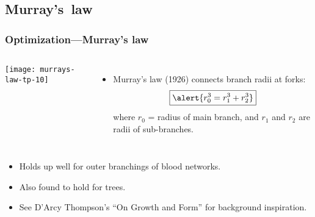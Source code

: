 \begin{frame}

  \showtarotcards{0.35}{
    john-dory,
    overview,
    complex-networks,
    random-networks,
    scale-free-networks,
    small-world-networks,
    theory-six-degrees,
    landscapes-of-forking-paths,
    networks-of-blood,
    trees-of-reality,
    orders-of-streams,
    laws-of-branching,
    unknown-mechanism,
    law-of-optimal-forks,
}

\end{frame}

\subsection{Murray's\ law}

\begin{frame}
  \frametitle{Optimization---Murray's law}

  \begin{columns}
    \texttt{[image: murrays-law-tp-10]}
    \begin{itemize}
    \item<1-> Murray's law (1926) connects branch radii at forks:\cite{murray1926a,murray1926b,murray1927a,labarbera1990a,thompson1961a}
      $$ \boxed{ \alert{r_0^{3} = r_1^{3} + r_2^{3}}} $$
      where $r_0$ = radius of main branch,
      and $r_1$ and $r_2$ are radii of sub-branches.
    \end{itemize}
  \end{columns}
    \begin{itemize}
    \item<2-> Holds up well for outer branchings of blood networks.
    \item<3-> Also found to hold for trees\cite{murray1927a,mcculloh2003a,mcculloh2004a}.
    \item<4-> See D'Arcy Thompson's ``On Growth and Form'' for background inspiration\cite{thompson1952a,thompson1961a}.
    \end{itemize}

\end{frame}


